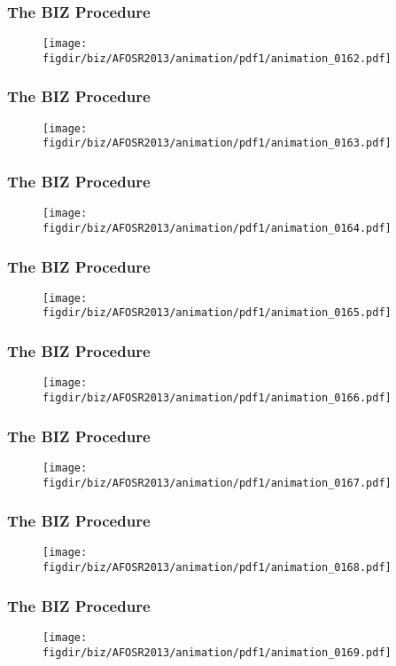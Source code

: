 \documentclass[13pt]{beamer}
\newcommand{\figdir}{../../fig}
\begin{document}
\begin{frame}\frametitle{The BIZ Procedure}\begin{figure}\texttt{[image: \\figdir/biz/AFOSR2013/animation/pdf1/animation\_0162.pdf]}\end{figure}\end{frame}
\begin{frame}\frametitle{The BIZ Procedure}\begin{figure}\texttt{[image: \\figdir/biz/AFOSR2013/animation/pdf1/animation\_0163.pdf]}\end{figure}\end{frame}
\begin{frame}\frametitle{The BIZ Procedure}\begin{figure}\texttt{[image: \\figdir/biz/AFOSR2013/animation/pdf1/animation\_0164.pdf]}\end{figure}\end{frame}
\begin{frame}\frametitle{The BIZ Procedure}\begin{figure}\texttt{[image: \\figdir/biz/AFOSR2013/animation/pdf1/animation\_0165.pdf]}\end{figure}\end{frame}
\begin{frame}\frametitle{The BIZ Procedure}\begin{figure}\texttt{[image: \\figdir/biz/AFOSR2013/animation/pdf1/animation\_0166.pdf]}\end{figure}\end{frame}
\begin{frame}\frametitle{The BIZ Procedure}\begin{figure}\texttt{[image: \\figdir/biz/AFOSR2013/animation/pdf1/animation\_0167.pdf]}\end{figure}\end{frame}
\begin{frame}\frametitle{The BIZ Procedure}\begin{figure}\texttt{[image: \\figdir/biz/AFOSR2013/animation/pdf1/animation\_0168.pdf]}\end{figure}\end{frame}
\begin{frame}\frametitle{The BIZ Procedure}\begin{figure}\texttt{[image: \\figdir/biz/AFOSR2013/animation/pdf1/animation\_0169.pdf]}\end{figure}\end{frame}
\end{document}
